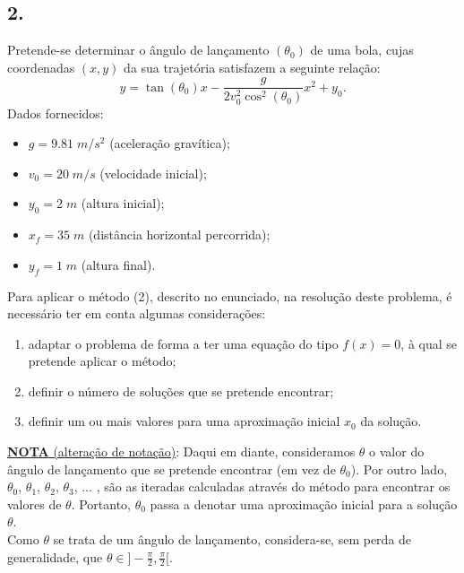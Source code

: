 \documentclass[12pt,a4paper]{article}
\begin{document}
    \newpage
    


    \newpage
    \subsection{2.}
    Pretende-se determinar o ângulo de lançamento $(\theta_0)$ de uma bola, cujas coordenadas $(x,y)$ da sua trajetória satisfazem a seguinte relação:
    \[
    y=\tan(\theta_0)x - \frac{g}{2v_0^2\cos^2(\theta_0)}x^2+y_0 .
    \]
    Dados fornecidos:
    \begin{itemize}
        \item  \( g=9.81\;m/s^2\) \;(aceleração gravítica);
        \item \( v_0=20\;m/s\) \;(velocidade inicial);
        \item \(y_0=2\;m\) \;(altura inicial);
        \item \(x_f=35\;m\) \;(distância horizontal percorrida);
        \item \(y_f=1\;m\) \;(altura final).
    \end{itemize}
    Para aplicar o método (2), descrito no enunciado, na resolução deste problema, é necessário ter em conta algumas considerações:

    \begin{enumerate}
        \item adaptar o problema de forma a ter uma equação do tipo \(f(x)=0\), à qual se pretende aplicar o método;
        \item definir o número de soluções que se pretende encontrar;
        \item definir um ou mais valores para uma aproximação inicial $x_0$ da solução.
    \end{enumerate}


    \noindent \underline{\textbf{NOTA} (alteração de notação)}: Daqui em diante, consideramos $\theta$ o valor do ângulo de lançamento que se pretende encontrar (em vez de $\theta_0$). Por outro lado, $\theta_0$, $\theta_1$, $\theta_2$, $\theta_3$, $\ldots$ , são as iteradas calculadas através do método para encontrar os valores de $\theta$. Portanto, $\theta_0$ passa a denotar uma aproximação inicial para a solução $\theta$.\\

    \noindent Como $\theta$ se trata de um ângulo de lançamento, considera-se, sem perda de generalidade, que $\theta \in ]-\frac{\pi}{2},\frac{\pi}{2}[$.
\end{document}
